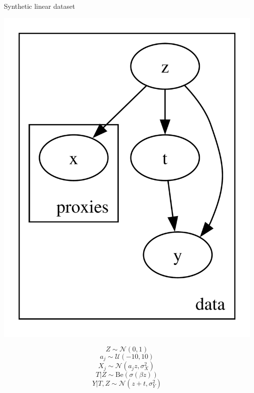 \documentclass[10pt]{beamer}
\begin{document}
\begin{frame}{Synthetic linear dataset}
    \begin{minipage}{0.48\textwidth}
      \includegraphics[width=\textwidth]{images/pyro_model.pdf}
    \end{minipage}
    \begin{minipage}{0.48\textwidth}
        \begin{equation*}
        Z \sim \mathcal{N}(0,1)
        \end{equation*}
        \begin{equation*}
             a_j \sim \mathcal{U}(-10,10)
        \end{equation*}
        \begin{equation*}
        X_j \sim \mathcal{N}(a_j z,\sigma_X^2)\,    
        \end{equation*}
        \begin{equation*}
        T | Z \sim \text{Be}(\sigma(\beta z))    
        \end{equation*}
        \small{\begin{equation*}
        Y|T,Z \sim \mathcal{N}(z + t, \sigma_Y^2)            
        \end{equation*}}
    \end{minipage}
\end{frame}
\end{document}
